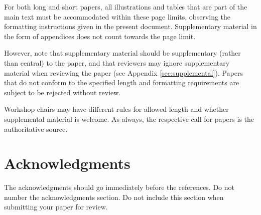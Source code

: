 \documentclass[11pt,a4paper]{article}
\begin{document}
For both long and short papers, all illustrations and tables that are part
of the main text must be accommodated within these page limits, observing
the formatting instructions given in the present document. Supplementary
material in the form of appendices does not count towards the page limit.

However, note that supplementary material should be supplementary
(rather than central) to the paper, and that reviewers may ignore
supplementary material when reviewing the paper (see Appendix
\ref{sec:supplemental}). Papers that do not conform to the specified
length and formatting requirements are subject to be rejected without
review.

Workshop chairs may have different rules for allowed length and
whether supplemental material is welcome. As always, the respective
call for papers is the authoritative source.

\section*{Acknowledgments}

The acknowledgments should go immediately before the references.  Do
not number the acknowledgments section. Do not include this section
when submitting your paper for review.

%
%


\end{document}
